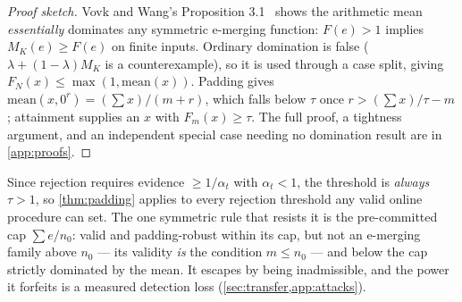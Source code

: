 \documentclass[conference]{IEEEtran}
\newcommand{\alphat}{\alpha_t}
\begin{document}
\begin{proof}[Proof sketch]
Vovk and Wang's Proposition 3.1~\cite{vovk2021evalues} shows the arithmetic mean
\emph{essentially} dominates any symmetric e-merging function: $F(e) > 1$ implies
$M_K(e) \ge F(e)$ on finite inputs. Ordinary domination is false ($\lambda + (1-\lambda)M_K$
is a counterexample), so it is used through a case split, giving
$F_N(x) \le \max(1, \mathrm{mean}(x))$. Padding gives
$\mathrm{mean}(x, 0^r) = (\sum x)/(m+r)$, which falls below $\tau$ once
$r > (\sum x)/\tau - m$; attainment supplies an $x$ with $F_m(x) \ge \tau$. The full proof, a
tightness argument, and an independent special case needing no domination result are in
\cref{app:proofs}.
\end{proof}

Since rejection requires evidence $\ge 1/\alphat$ with $\alphat < 1$, the threshold is
\emph{always} $\tau > 1$, so \cref{thm:padding} applies to every rejection threshold any
valid online procedure can set. The one symmetric rule that resists it is the pre-committed cap
$\sum e / n_0$: valid and padding-robust within its cap, but not an e-merging family above $n_0$ ---
its validity \emph{is} the condition $m \le n_0$ --- and below the cap strictly
dominated by the mean. It escapes by being inadmissible, and the power it forfeits is a measured
detection loss (\cref{sec:transfer,app:attacks}).
\end{document}

